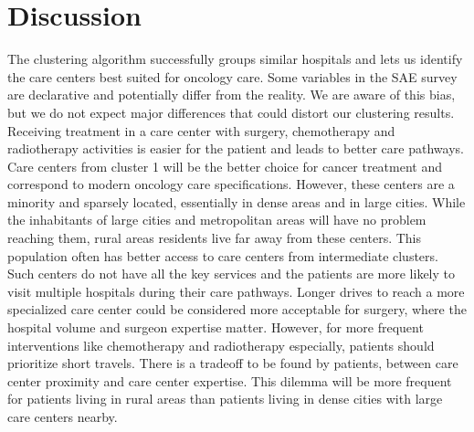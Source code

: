\begin{table}[!ht]
{    }
    \label{table:table-1}
\end{table}

\section{Discussion}

The clustering algorithm successfully groups similar hospitals and lets us identify the care centers best suited for oncology care. Some variables in the SAE survey are declarative and potentially differ from the reality. We are aware of this bias, but we do not expect major differences that could distort our clustering results.
Receiving treatment in a care center with surgery, chemotherapy and radiotherapy activities is easier for the patient and leads to better care pathways. Care centers from cluster 1 will be the better choice for cancer treatment and correspond to modern oncology care specifications. However, these centers are a minority and sparsely located, essentially in dense areas and in large cities. While the inhabitants of large cities and metropolitan areas will have no problem reaching them, rural areas residents live far away from these centers. This population often has better access to care centers from intermediate clusters. Such centers do not have all the key services and the patients are more likely to visit multiple hospitals during their care pathways.
Longer drives to reach a more specialized care center could be considered more acceptable for surgery, where the hospital volume and surgeon expertise matter. However, for more frequent interventions like chemotherapy and radiotherapy especially, patients should prioritize short travels. There is a tradeoff to be found by patients, between care center proximity and care center expertise. This dilemma will be more frequent for patients living in rural areas than patients living in dense cities with large care centers nearby.

